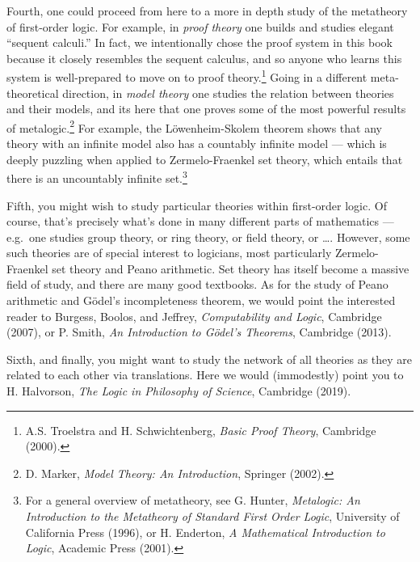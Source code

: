 Fourth, one could proceed from here to a more in depth study of the
metatheory of first-order logic.  For example, in \emph{proof theory}
one builds and studies elegant ``sequent calculi.''  In fact, we
intentionally chose the proof system in this book because it closely
resembles the sequent calculus, and so anyone who learns this system
is well-prepared to move on to proof theory.\footnote{A.S. Troelstra
  and H. Schwichtenberg, {\it Basic Proof Theory}, Cambridge (2000).}
Going in a different meta-theoretical direction, in \emph{model
  theory} one studies the relation between theories and their models,
and its here that one proves some of the most powerful results of
metalogic.\footnote{D. Marker, {\it Model Theory: An Introduction},
  Springer (2002).} For example, the L{\"o}wenheim-Skolem theorem
shows that any theory with an infinite model also has a countably
infinite model --- which is deeply puzzling when applied to
Zermelo-Fraenkel set theory, which entails that there is an
uncountably infinite set.\footnote{For a general overview of
  metatheory, see G. Hunter, {\it Metalogic: An Introduction to the
    Metatheory of Standard First Order Logic}, University of
  California Press (1996), or H. Enderton, {\it A Mathematical
    Introduction to Logic}, Academic Press (2001).}

Fifth, you might wish to study particular theories within first-order
logic.  Of course, that's precisely what's done in many different
parts of mathematics --- e.g.\ one studies group theory, or ring
theory, or field theory, or \dots . However, some such theories are of
special interest to logicians, most particularly Zermelo-Fraenkel set
theory and Peano arithmetic.  Set theory has itself become a massive
field of study, and there are many good textbooks.  As for the study
of Peano arithmetic and G{\"o}del's incompleteness theorem, we would
point the interested reader to Burgess, Boolos, and Jeffrey, {\it
  Computability and Logic}, Cambridge (2007), or P. Smith, {\it An
  Introduction to G\"odel's Theorems}, Cambridge (2013).

Sixth, and finally, you might want to study the network of all
theories as they are related to each other via translations.  Here we
would (immodestly) point you to H. Halvorson, {\it The Logic in
  Philosophy of Science}, Cambridge (2019).









